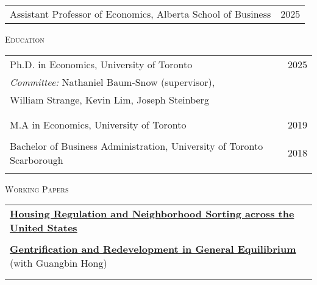 \documentclass[11pt]{amsart}
\begin{document}
\normalsize
\begin{tabular}{ p{12.5cm}  p{5cm}}
	\large{Assistant Professor of Economics, Alberta School of Business}  & 2025  \\
 
\end{tabular}

\vspace{0.2cm}

\LARGE
\textsc{Education}
\vspace{0.2cm}

\normalsize
\begin{tabular}{ p{12.5cm}  p{5cm}}
  \large{Ph.D. in Economics, University of Toronto}  & 2025  \\
   \multicolumn{2}{l}{ \hspace{.75cm}  \emph{Committee:}  Nathaniel Baum-Snow (supervisor), } \\
     \hspace{2.8cm}  William Strange, Kevin Lim, Joseph Steinberg  \\
 \hspace{2.90cm}   \\
  \\
  \large{M.A in Economics, University of Toronto}    & 2019            \\
   \\
  \large{Bachelor of Business Administration, University of Toronto Scarborough}   & 2018            \\
                                                     &                 
\end{tabular}

\vspace{0.4cm}





\LARGE
\textsc{Working Papers}
\vspace{0.2cm}
\normalsize

\begin{tabular}{ p{15.5cm}}
 \href{https://jamesmacek.github.io/research/lswus}{\textbf{Housing Regulation and Neighborhood Sorting across the United States}}                         \\

\\
 \href{https://jamesmacek.github.io/research/gent}{\textbf{Gentrification and Redevelopment in General Equilibrium}} (with Guangbin Hong) \\
\\
\normalsize
\end{tabular}
\end{document}
